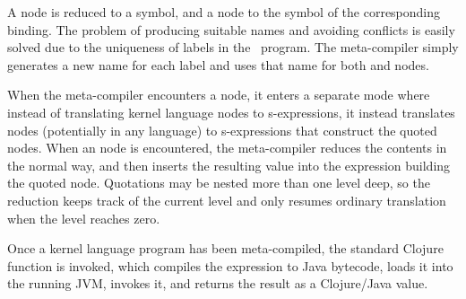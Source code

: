 
A  node is reduced to a symbol, and a  node to the symbol of the corresponding binding. The problem of producing suitable names and avoiding conflicts is easily solved due to the uniqueness of labels in the \Meta\ program. The meta-compiler simply generates a new name for each label and uses that name for both  and  nodes.

When the meta-compiler encounters a  node, it enters a separate mode where instead of translating kernel language nodes to s-expressions, it instead translates nodes (potentially in any language) to s-expressions that construct the quoted nodes. When an  node is encountered, the meta-compiler reduces the contents in the normal way, and then inserts the resulting value into the expression building the quoted node. Quotations may be nested more than one level deep, so the reduction keeps track of the current level and only resumes ordinary translation when the level reaches zero.


Once a kernel language program has been meta-compiled, the standard Clojure function  is invoked, which compiles the expression to Java bytecode, loads it into the running JVM, invokes it, and returns the result as a Clojure/Java value. %



